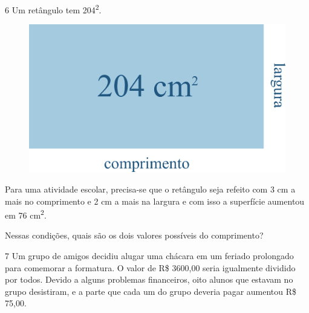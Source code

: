 \num{6} Um retângulo tem 204\textsuperscript{2}.

\begin{figure}[htpb!]
\centering
\includegraphics[width=.6\textwidth]{./ilustras-mat/modulo_7-atividade_6.png}
\end{figure}

Para uma atividade escolar, precisa-se que o retângulo seja refeito com 3
cm a mais no comprimento e 2 cm a mais na largura e com isso a
superfície aumentou em 76 cm\textsuperscript{2}.

Nessas condições, quais são os dois valores possíveis do comprimento?

\begin{emptybox}
\coment{
\vspace{5cm}







}
\end{emptybox}

\num{7} Um grupo de amigos decidiu alugar uma chácara em um feriado
prolongado para comemorar a formatura. O valor de R\$ 3600,00 seria igualmente
dividido por todos. Devido a alguns problemas financeiros, oito alunos
que estavam no grupo desistiram, e a parte que cada um do grupo deveria
pagar aumentou R\$ 75,00.

